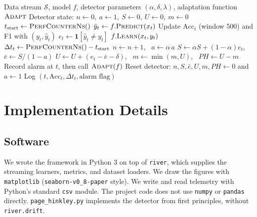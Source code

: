 \documentclass[conference]{IEEEtran}
\begin{document}
\begin{algorithm}[htbp]
\caption{EWMA-PH Prequential Evaluation and Online Adaptation}
\label{alg:framework}
\footnotesize
\begin{algorithmic}[1]
\renewcommand{\algorithmicrequire}{\textbf{Input:}}
\REQUIRE Data stream $\mathcal{S}$, model $f$, detector parameters $(\alpha, \delta, \lambda)$, adaptation function $\textsc{Adapt}$
\STATE Detector state: $n \leftarrow 0,\ a \leftarrow 1,\ S \leftarrow 0,\ U \leftarrow 0,\ m \leftarrow 0$
    \STATE $t_{\text{start}} \leftarrow \textsc{PerfCounterNs}()$
    \STATE $\hat{y}_t \leftarrow f.\textsc{Predict}(x_t)$
    \STATE Update $\text{Acc}_t$ (window 500) and F1 with $(y_t, \hat{y}_t)$
    \STATE $e_t \leftarrow \mathbf{1}[\hat{y}_t \neq y_t]$
    \STATE $f.\textsc{Learn}(x_t, y_t)$
    \STATE $\Delta t_t \leftarrow \textsc{PerfCounterNs}() - t_{\text{start}}$
    \STATE $n \leftarrow n + 1$, \ $a \leftarrow \alpha\, a$ 
    \STATE $S \leftarrow \alpha S + (1 - \alpha) e_t$, \ $\bar{e} \leftarrow S / (1 - a)$
    \STATE $U \leftarrow U + (e_t - \bar{e} - \delta)$, \ $m \leftarrow \min(m, U)$, \ $PH \leftarrow U - m$
        \STATE Record alarm at $t$, then call $\textsc{Adapt}(f)$ 
        \STATE Reset detector: $n, S, \bar{e}, U, m, PH \leftarrow 0$ and $a \leftarrow 1$
    \ENDIF
    \STATE Log $(t, \text{Acc}_t, \Delta t_t, \text{alarm flag})$
\ENDFOR
\end{algorithmic}
\end{algorithm}

\section{Implementation Details}

\subsection{Software}
We wrote the framework in Python 3 on top of \texttt{river}, which supplies the streaming learners, metrics, and dataset loaders.
We draw the figures with \texttt{matplotlib} (\texttt{seaborn-v0\_8-paper} style).
We write and read telemetry with Python's standard \texttt{csv} module. The project code does not use \texttt{numpy} or \texttt{pandas} directly.
\texttt{page\_hinkley.py} implements the detector from first principles, without \texttt{river.drift}.
\end{document}
